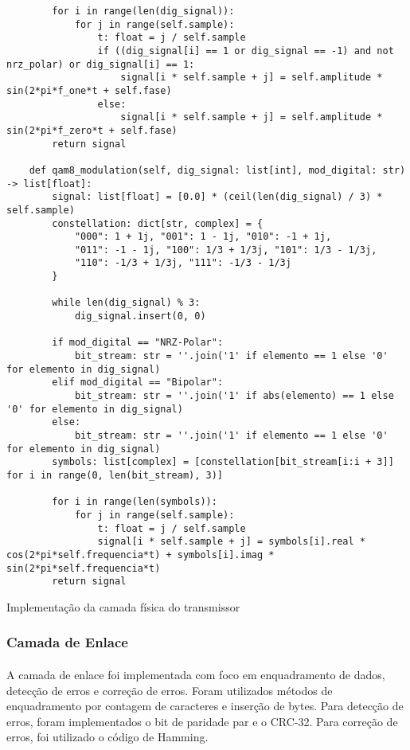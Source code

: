 \documentclass[12pt, a4paper]{article}
\newenvironment{code}{\captionsetup{type=listing}}{}
\begin{document}
\begin{code}
\begin{verbatim}
        for i in range(len(dig_signal)):
            for j in range(self.sample):
                t: float = j / self.sample
                if ((dig_signal[i] == 1 or dig_signal == -1) and not nrz_polar) or dig_signal[i] == 1:
                    signal[i * self.sample + j] = self.amplitude * sin(2*pi*f_one*t + self.fase)
                else:
                    signal[i * self.sample + j] = self.amplitude * sin(2*pi*f_zero*t + self.fase)
        return signal

    def qam8_modulation(self, dig_signal: list[int], mod_digital: str) -> list[float]:
        signal: list[float] = [0.0] * (ceil(len(dig_signal) / 3) * self.sample)
        constellation: dict[str, complex] = {
            "000": 1 + 1j, "001": 1 - 1j, "010": -1 + 1j,
            "011": -1 - 1j, "100": 1/3 + 1/3j, "101": 1/3 - 1/3j,
            "110": -1/3 + 1/3j, "111": -1/3 - 1/3j
        }

        while len(dig_signal) % 3:
            dig_signal.insert(0, 0)

        if mod_digital == "NRZ-Polar":
            bit_stream: str = ''.join('1' if elemento == 1 else '0' for elemento in dig_signal)
        elif mod_digital == "Bipolar":
            bit_stream: str = ''.join('1' if abs(elemento) == 1 else '0' for elemento in dig_signal)
        else: 
            bit_stream: str = ''.join('1' if elemento == 1 else '0' for elemento in dig_signal)
        symbols: list[complex] = [constellation[bit_stream[i:i + 3]] for i in range(0, len(bit_stream), 3)]

        for i in range(len(symbols)):
            for j in range(self.sample):
                t: float = j / self.sample
                signal[i * self.sample + j] = symbols[i].real * cos(2*pi*self.frequencia*t) + symbols[i].imag * sin(2*pi*self.frequencia*t)
        return signal
\end{verbatim}
\caption{Implementação da camada física do transmissor}
\end{code}

\subsubsection{Camada de Enlace}
\paragraph{}
A camada de enlace foi implementada com foco em enquadramento de dados, detecção de erros e correção de erros. Foram utilizados métodos de enquadramento por contagem de caracteres e inserção de bytes. Para detecção de erros, foram implementados o bit de paridade par e o CRC-32. Para correção de erros, foi utilizado o código de Hamming.
\end{document}
